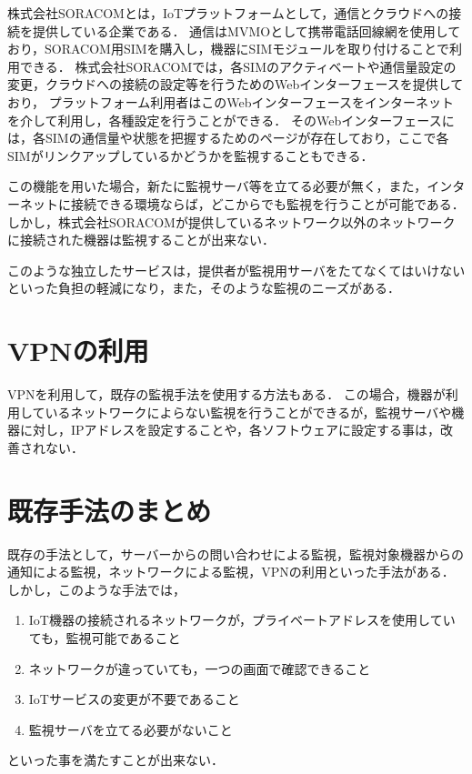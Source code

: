 	株式会社SORACOMとは，IoTプラットフォームとして，通信とクラウドへの接続を提供している企業である．
	通信はMVMOとして携帯電話回線網を使用しており，SORACOM用SIMを購入し，機器にSIMモジュールを取り付けることで利用できる．
	株式会社SORACOMでは，各SIMのアクティベートや通信量設定の変更，クラウドへの接続の設定等を行うためのWebインターフェースを提供しており，
	プラットフォーム利用者はこのWebインターフェースをインターネットを介して利用し，各種設定を行うことができる．
	そのWebインターフェースには，各SIMの通信量や状態を把握するためのページが存在しており，ここで各SIMがリンクアップしているかどうかを監視することもできる．

	この機能を用いた場合，新たに監視サーバ等を立てる必要が無く，また，インターネットに接続できる環境ならば，どこからでも監視を行うことが可能である．
	しかし，株式会社SORACOMが提供しているネットワーク以外のネットワークに接続された機器は監視することが出来ない．

	このような独立したサービスは，提供者が監視用サーバをたてなくてはいけないといった負担の軽減になり，また，そのような監視のニーズがある．

\section{VPNの利用}
	VPNを利用して，既存の監視手法を使用する方法もある．
	この場合，機器が利用しているネットワークによらない監視を行うことができるが，監視サーバや機器に対し，IPアドレスを設定することや，各ソフトウェアに設定する事は，改善されない．

\section{既存手法のまとめ}
	既存の手法として，サーバーからの問い合わせによる監視，監視対象機器からの通知による監視，ネットワークによる監視，VPNの利用といった手法がある．
	しかし，このような手法では，
	\begin{enumerate}
		\item IoT機器の接続されるネットワークが，プライベートアドレスを使用していても，監視可能であること
		\item ネットワークが違っていても，一つの画面で確認できること
		\item IoTサービスの変更が不要であること
		\item 監視サーバを立てる必要がないこと
	\end{enumerate}
	といった事を満たすことが出来ない．

